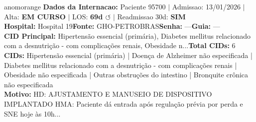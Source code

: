 \documentclass[a4paper,10pt]{article}
\begin{document}
\begin{anomalycard}[Internacao 161907 | GHO-PETROBRAS | ALTO (z=4.70)]{anomorange}
\textbf{Dados da Internacao:} Paciente 95700 $\mid$ Admissao: 13/01/2026 $\mid$ Alta: \textcolor{anomorange}{\textbf{EM CURSO}} $\mid$ LOS: \textbf{69d \textcolor{anomorange}{$\circlearrowleft$}} $\mid$ Readmissao 30d: \textcolor{anomred}{\textbf{SIM}}\\
\textbf{Hospital:} Hospital 19\quad\textbf{Fonte:} GHO-PETROBRAS\quad\textbf{Senha:} ---\quad\textbf{Guia:} ---\\
\textbf{CID Principal:} {\small Hipertensão essencial (primária), Diabetes mellitus relacionado com a desnutrição - com complicações renais, Obesidade n...}\quad\textbf{Total CIDs:} 6\\

\textbf{CIDs:} {\scriptsize Hipertensão essencial (primária) | Doença de Alzheimer não especificada | Diabetes mellitus relacionado com a desnutrição - com complicações renais | Obesidade não especificada | Outras obstruções do intestino | Bronquite crônica não especificada}\\

\textbf{Motivo:} {\scriptsize HD: AJUSTAMENTO E MANUSEIO DE DISPOSITIVO IMPLANTADO  HMA: Paciente dá entrada após regulação prévia por perda e SNE hoje às 10h...}\\


\end{anomalycard}
\end{document}
